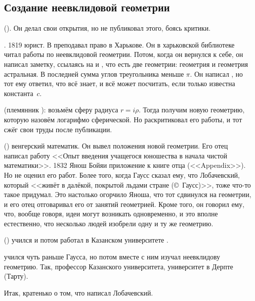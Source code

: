 \documentclass[a4paper,oneside,fleqn,10pt]{article}
\begin{document}
\subsection{Создание неевклидовой геометрии}

 (). Он делал свои открытия,
но не публиковал этого, боясь критики.

. 1819 юрист. В  преподавал право в Харькове.
Он в харьковской библиотеке читал работы  по неевклидовой геометрии.
Потом, когда он вернулся к себе, он написал заметку, ссылаясь на 
и , что есть две геометрии: геометрия  и геометрия астральная.
В последней сумма углов треугольника меньше $\pi$. Он написал ,
но тот ему ответил, что всё знает, и всё может посчитать, если только известна константа~$c$.

 (племянник ): возьмём сферу радиуса $r = i\rho$. Тогда получим новую геометрию,
которую назовём логарифмо сферической. Но  раскритиковал его работы,
и тот сжёг свои труды после публикации.

 () венгерский математик.
Он вывел положения новой геометрии. Его отец 
написал работу <<Опыт введения учащегося юношества в начала чистой математики>>.
1832 Янош Бойяи приложение к книге отца (<<Appendix>>). Но  не оценил его работ.
Более того, когда Гаусс сказал ему, что Лобачевский, который <<живёт в далёкой, покрытой льдами стране (\copyright~Гаусс)>>,
тоже что-то такое придумал.
Это настолько огорчило Яноша, что тот сдвинулся на геометрии,
и его отец отговаривал его от занятий геометрией. Кроме того,
он говорил ему, что, вообще говоря, идеи могут возникать одновременно,
и это вполне естественно, что несколько людей изобрели одну и ту же
геометрию.

 ()
учился и потом работал в Казанском университете .

  учился чуть раньше Гаусса, но потом вместе с ним
изучал неевклидову геометрию. Так,  профессор Казанского
университета,  университет в Дерпте (Тарту).

Итак, кратенько о том, что написал Лобачевский.
\end{document}

